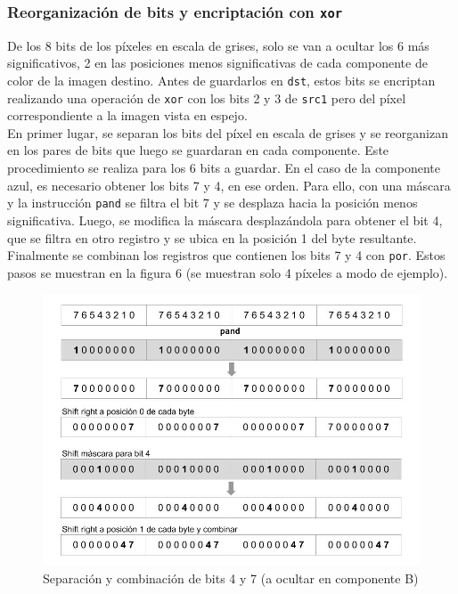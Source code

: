 \documentclass[a4paper]{article}
\begin{document}
\subsubsection{Reorganización de bits y encriptación con {\tt xor}}
De los 8 bits de los píxeles en escala de grises, solo se van a ocultar los 6 más significativos, 2 en las posiciones menos significativas de cada componente de color de la imagen destino. Antes de guardarlos en {\tt dst}, estos bits se encriptan realizando una operación de {\tt xor} con los bits 2 y 3 de {\tt src1} pero del píxel correspondiente a la imagen vista en espejo. \\
En primer lugar, se separan los bits del píxel en escala de grises y se reorganizan en los pares de bits que luego se guardaran en cada componente.
Este procedimiento se realiza para los 6 bits a guardar. En el caso de la componente azul, es necesario obtener los bits 7 y 4, en ese orden. Para ello, con una máscara y la instrucción {\tt pand} se filtra el bit 7 y se desplaza hacia la posición menos significativa. Luego, se modifica la máscara desplazándola para obtener el bit 4, que se filtra en otro registro y se ubica en la posición 1 del byte resultante. Finalmente se combinan los registros que contienen los bits 7 y 4 con {\tt por}. Estos pasos se muestran en la figura 6 (se muestran solo 4 píxeles a modo de ejemplo).

\begin{figure}[!htb]
  \begin{center}
	\includegraphics[scale=0.4]{img/ocultar/ReorganizarBits.jpg}
	\caption{Separación y combinación de bits 4 y 7 (a ocultar en componente B)}
  \end{center}
\end{figure}
\end{document}
